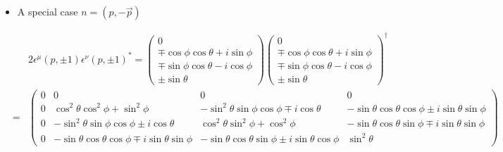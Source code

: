 \documentclass[11pt]{article}
\def\dgr{\dagger}
\def\eps{\epsilon}
\begin{document}
\section{ }
\begin{itemize}
    \item A special case $n=(p,-\vec{p})$
\end{itemize}
\begin{eqnarray}
    &&2 \eps^\mu(p,\pm1) \eps^\nu(p,\pm1)^* =
    \begin{pmatrix}
        0 \\ \mp\cos\phi\cos\theta+i\sin\phi \\ \mp\sin\phi\cos\theta-i\cos\phi \\ \pm \sin\theta
    \end{pmatrix}
    \begin{pmatrix}
        0 \\ \mp\cos\phi\cos\theta+i\sin\phi \\ \mp\sin\phi\cos\theta-i\cos\phi \\ \pm \sin\theta
    \end{pmatrix}^\dgr \nonumber \\
   &=& 
   \begin{pmatrix}
       0 & 0 & 0 & 0 \\
       0 & \cos^2\theta\cos^2\phi+\sin^2\phi & -\sin^2\theta\sin\phi\cos\phi \mp i\cos\theta & -\sin\theta\cos\theta\cos\phi\pm i \sin\theta\sin\phi \\
       0 & -\sin^2\theta\sin\phi\cos\phi \pm i\cos\theta & \cos^2\theta\sin^2\phi  + \cos^2\phi & -\sin\theta\cos\theta \sin\phi \mp i\sin\theta\sin\phi \\
       0 &  -\sin\theta\cos\theta\cos\phi \mp i \sin\theta\sin\phi & -\sin\theta\cos\theta\sin\phi \pm i \sin\theta\cos\phi & \sin^2\theta
   \end{pmatrix} \nonumber 
\end{eqnarray}
\end{document}
